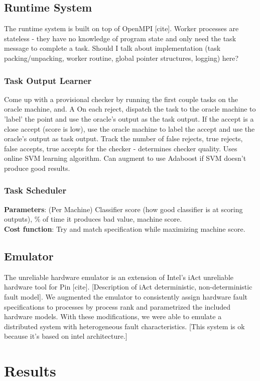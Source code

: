 \documentclass[11pt,twocolumn]{article}
\begin{document}
\subsection {Runtime System}
The runtime system is built on top of OpenMPI [cite]. Worker processes are stateless - they have no knowledge of program state and only need the task message to complete a task. Should I talk about implementation (task packing/unpacking, worker routine, global pointer structures, logging) here?
\subsubsection {Task Output Learner}
Come up with a provisional checker by running the first couple tasks on the oracle machine, and. A On each reject, dispatch the task to the oracle machine to 'label' the point and use the oracle's output as the task output. If the accept is a close accept (score is low), use the oracle machine to label the accept and use the oracle's output as task output. Track the number of false rejects, true rejects, false accepts, true accepts for the checker - determines checker quality. Uses online SVM learning algorithm. Can augment to use Adaboost if SVM doesn't produce good results.
\subsubsection {Task Scheduler}
\textbf{Parameters}: (Per Machine) Classifier score (how good classifier is at scoring outputs), \% of time it produces bad value, machine score.\\
\textbf{Cost function}: Try and match specification while maximizing machine score.\\
\subsection {Emulator}
The unreliable hardware emulator is an extension of Intel's iAct unreliable hardware tool for Pin [cite]. [Description of iAct deterministic, non-deterministic fault model]. We augmented the emulator to consistently assign hardware fault specifications to processes by process rank and parametrized the included hardware models. With these modifications, we were able to emulate a distributed system with heterogeneous fault characteristics. [This system is ok because it's based on intel architecture.]
\section {Results}
\end{document}
